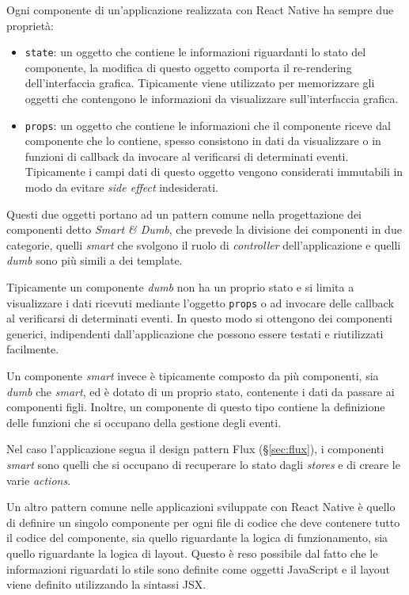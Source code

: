 Ogni componente di un'applicazione realizzata con React Native ha sempre due proprietà:
\begin{itemize}
\item \texttt{state}: un oggetto che contiene le informazioni riguardanti lo stato del componente, la modifica di questo oggetto comporta il re-rendering dell'interfaccia grafica. Tipicamente viene utilizzato per memorizzare gli oggetti che contengono le informazioni da visualizzare sull'interfaccia grafica.
\item \texttt{props}: un oggetto che contiene le informazioni che il componente riceve dal componente che lo contiene, spesso consistono in dati da visualizzare o in funzioni di callback da invocare al verificarsi di determinati eventi. Tipicamente i campi dati di questo oggetto vengono considerati immutabili in modo da evitare \textit{side effect} indesiderati.
\end{itemize}

Questi due oggetti portano ad un pattern comune nella progettazione dei componenti detto \textit{Smart \& Dumb}, che prevede la divisione dei componenti in due categorie, quelli \textit{smart} che svolgono il ruolo di \textit{controller} dell'applicazione e quelli \textit{dumb} sono più simili a dei template.

Tipicamente un componente \textit{dumb} non ha un proprio stato e si limita a visualizzare i dati ricevuti mediante l'oggetto \texttt{props} o ad invocare delle callback al verificarsi di determinati eventi. In questo modo si ottengono dei componenti generici, indipendenti dall'applicazione che possono essere testati e riutilizzati facilmente.

Un componente \textit{smart} invece è tipicamente composto da più componenti, sia \textit{dumb} che \textit{smart}, ed è dotato di un proprio stato, contenente i dati da passare ai componenti figli.
Inoltre, un componente di questo tipo contiene la definizione delle funzioni che si occupano della gestione degli eventi.

Nel caso l'applicazione segua il design pattern Flux (§\ref{sec:flux}), i componenti \textit{smart} sono quelli che si occupano di recuperare lo stato dagli \textit{stores} e di creare le varie \textit{actions}.

Un altro pattern comune nelle applicazioni sviluppate con React Native è quello di definire un singolo componente per ogni file di codice che deve contenere tutto il codice del componente, sia quello riguardante la logica di funzionamento, sia quello riguardante la logica di layout.
Questo è reso possibile dal fatto che le informazioni riguardati lo stile sono definite come oggetti JavaScript e il layout viene definito utilizzando la sintassi JSX.

